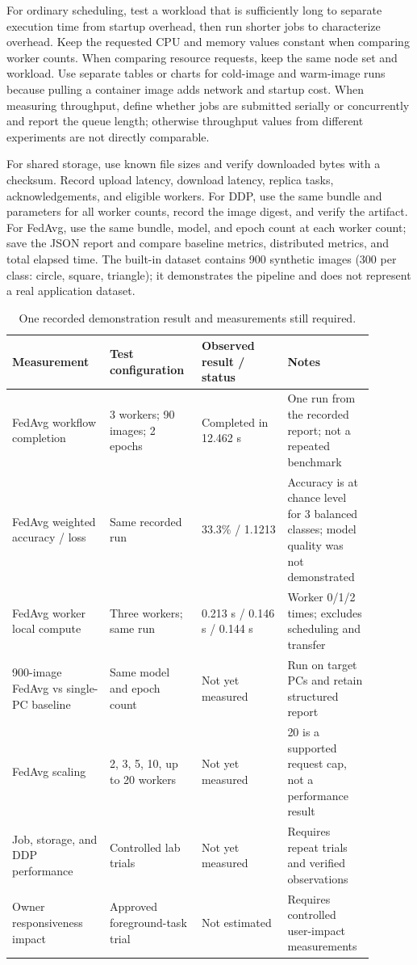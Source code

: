 \documentclass{article}
\begin{document}
For ordinary scheduling, test a workload that is sufficiently long to separate execution time from startup overhead, then run shorter jobs to characterize overhead. Keep the requested CPU and memory values constant when comparing worker counts. When comparing resource requests, keep the same node set and workload. Use separate tables or charts for cold-image and warm-image runs because pulling a container image adds network and startup cost. When measuring throughput, define whether jobs are submitted serially or concurrently and report the queue length; otherwise throughput values from different experiments are not directly comparable.

For shared storage, use known file sizes and verify downloaded bytes with a checksum. Record upload latency, download latency, replica tasks, acknowledgements, and eligible workers. For DDP, use the same bundle and parameters for all worker counts, record the image digest, and verify the artifact. For FedAvg, use the same bundle, model, and epoch count at each worker count; save the JSON report and compare baseline metrics, distributed metrics, and total elapsed time. The built-in dataset contains 900 synthetic images (300 per class: circle, square, triangle); it demonstrates the pipeline and does not represent a real application dataset.

\begin{table}[h!]
\centering
\caption{One recorded demonstration result and measurements still required.}
\label{tab:results}
\begin{tabular}{|p{0.25\linewidth}|p{0.22\linewidth}|p{0.22\linewidth}|p{0.2\linewidth}|}
\hline
Measurement & Test configuration & Observed result / status & Notes \\
\hline
FedAvg workflow completion & 3 workers; 90 images; 2 epochs & Completed in 12.462 s & One run from the recorded report; not a repeated benchmark \\
\hline
FedAvg weighted accuracy / loss & Same recorded run & 33.3\% / 1.1213 & Accuracy is at chance level for 3 balanced classes; model quality was not demonstrated \\
\hline
FedAvg worker local compute & Three workers; same run & 0.213 s / 0.146 s / 0.144 s & Worker 0/1/2 times; excludes scheduling and transfer \\
\hline
900-image FedAvg vs single-PC baseline & Same model and epoch count & Not yet measured & Run on target PCs and retain structured report \\
\hline
FedAvg scaling & 2, 3, 5, 10, up to 20 workers & Not yet measured & 20 is a supported request cap, not a performance result \\
\hline
Job, storage, and DDP performance & Controlled lab trials & Not yet measured & Requires repeat trials and verified observations \\
\hline
Owner responsiveness impact & Approved foreground-task trial & Not estimated & Requires controlled user-impact measurements \\
\hline
\end{tabular}
\end{table}
\end{document}
